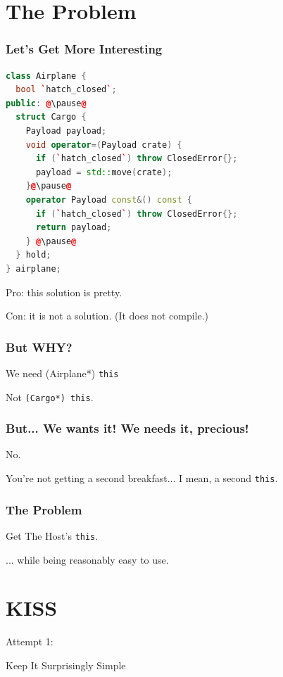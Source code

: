\documentclass{beamer}
\def\code#1{\texttt{#1}}
\newcommand{\this}{\code{this}\xspace}
\newcommand{\nl}{\vspace{0.2\baselineskip}}
\newcommand{\HI}{{\Huge I}{\hspace{-1pt}}}
\newcommand{\HS}{{\Huge S}{\hspace{-1pt}}}
\newcommand{\HK}{{\Huge K}{\hspace{-1pt}}}
\begin{document}
\section{The Problem}

\begin{frame}[fragile]
  \frametitle{Let's Get More Interesting}
\begin{lstlisting}[language=cpp]
class Airplane {
  bool `hatch_closed`;
public: @\pause@
  struct Cargo {
    Payload payload;
    void operator=(Payload crate) {
      if (`hatch_closed`) throw ClosedError{};
      payload = std::move(crate);
    }@\pause@
    operator Payload const&() const {
      if (`hatch_closed`) throw ClosedError{};
      return payload;
    } @\pause@
  } hold;
} airplane;
\end{lstlisting}
\pause
Pro: this solution is pretty.
\pause

Con: it is not a solution. {\tiny (It does not compile.)}
\end{frame}

\begin{frame}
  \frametitle{But WHY?}
\begin{center}
  {\Huge We need (Airplane*) \this}
  \vspace{.8 in} 

  Not \code{(Cargo*) this}.
\end{center}
\end{frame}


\begin{frame}[fragile]
  \frametitle{But... We wants it! We needs it, precious!}

\begin{center}
  {\Huge No.}
  \vspace{.8 in} 

  You're not getting a second breakfast... I mean, a second \this.
\end{center}
\end{frame}


\begin{frame}
  \frametitle{The Problem}

\begin{center}
  {\Huge Get The Host's \this.} \nl

  ... while being reasonably easy to use.
\end{center}
\end{frame}


\section{KISS}
\begin{frame}
\begin{center}
  Attempt 1:\nl\nl

  \HK eep \HI t \HS urprisingly \HS imple
\end{center}
\end{frame}
\end{document}
